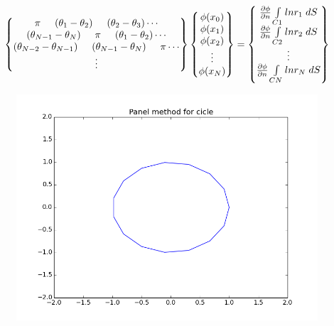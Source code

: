 \documentclass[a4paper,norsk]{article}
\begin{document}
\begin{align*}
\begin{Bmatrix}
\pi \hspace{5mm} (\theta_1 - \theta_2) \hspace{5mm} (\theta_2 - \theta_3) \cdots \\
(\theta_{N-1} - \theta_N)  \hspace{5mm} \pi \hspace{5mm}(\theta_1 - \theta_2) \cdots \\
(\theta_{N-2} - \theta_{N-1})  \hspace{5mm} (\theta_{N-1} - \theta_N) \hspace{5mm} \pi \cdots \\
\vdots 
\end{Bmatrix}
\begin{Bmatrix}
\phi(x_0) \\
\phi(x_1) \\
\phi(x_2) \\
\vdots \\
\phi(x_N)
\end{Bmatrix}
=
\begin{Bmatrix}
\frac{\partial \phi}{\partial n} \int\limits_{C1} ln r_1 \hspace{1mm} dS \\
\frac{\partial \phi}{\partial n} \int\limits_{C2} ln r_2 \hspace{1mm} dS \\
\vdots \\
\frac{\partial \phi}{\partial n} \int\limits_{CN} ln r_N \hspace{1mm} dS
\end{Bmatrix}
\end{align*} 

\begin{figure}[h!]	
	\centering
	\includegraphics[scale=0.6]{panelcircle.png}
\end{figure}
\end{document}
